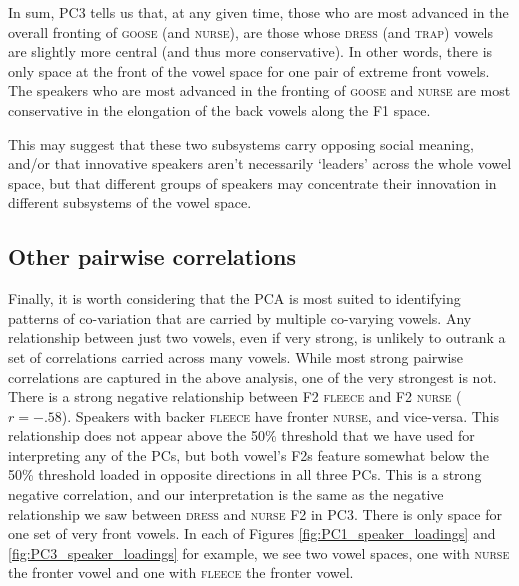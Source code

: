 \documentclass[review]{elsarticle} %
\begin{document}
In sum, PC3 tells us that, at any given time, those who are most advanced in the overall fronting of \textsc{goose} (and \textsc{nurse}), are those whose \textsc{dress} (and \textsc{trap}) vowels are slightly more central (and thus more conservative).  In other words, there is only space at the front of the vowel space for one pair of extreme front vowels. The speakers who are most advanced in the fronting of \textsc{goose} and \textsc{nurse} are most conservative in the elongation of the back vowels along the F1 space.

This may suggest that these two subsystems carry opposing social meaning, and/or that innovative speakers aren't necessarily `leaders' across the whole vowel space, but that different groups of speakers may concentrate their innovation in different subsystems of the vowel space.






\subsection{Other pairwise correlations}

Finally, it is worth considering that the PCA is most suited to identifying patterns of co-variation that are carried by multiple co-varying vowels.  Any relationship between just two vowels, even if very strong, is unlikely to outrank a set of correlations carried across many vowels.  While most strong pairwise correlations are captured in the above analysis, one of the very strongest is not. There is a strong negative relationship between F2 \textsc{fleece} and F2 \textsc{nurse} ($r = -.58$).  Speakers with backer \textsc{fleece} have fronter \textsc{nurse}, and vice-versa.  This relationship does not appear above the 50\% threshold that we have used for interpreting any of the PCs, but both vowel's F2s feature somewhat below the 50\% threshold loaded in opposite directions in all three PCs.  This is a strong negative correlation, and our interpretation is the same as the negative relationship we saw between \textsc{dress} and \textsc{nurse} F2 in PC3.  There is only space for one set of very front vowels.  In each of Figures \ref{fig:PC1_speaker_loadings} and \ref{fig:PC3_speaker_loadings} for example, we see two vowel spaces, one with \textsc{nurse} the fronter vowel and one with \textsc{fleece} the fronter vowel.
\end{document}

